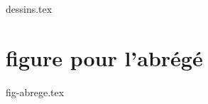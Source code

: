 \documentclass[a4paper, 11pt]{article}%
\begin{document}
\pagestyle{dessins}
{dessins.tex}
\label{last_page_dessins}
\clearpage


\setcounter{page}{1}
\pagestyle{fig-abrege}
\section{figure pour l'abrégé}
{fig-abrege.tex}
\clearpage

\end{document}
